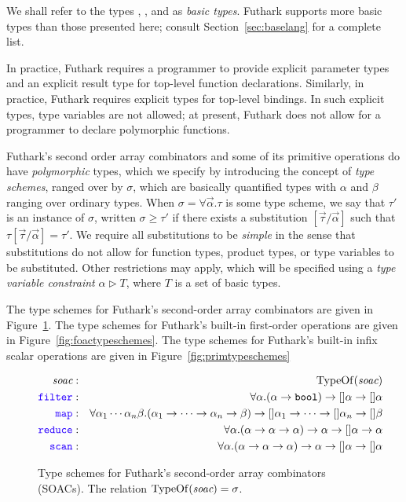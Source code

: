 \documentclass[oneside,11pt]{book}
\begin{document}
\noindent We shall refer to the types , , and  as
\emph{basic types}. Futhark supports more basic types than those
presented here; consult Section~\ref{sec:baselang} for a complete list.

In practice, Futhark requires a programmer to provide explicit
parameter types and an explicit result type for top-level function
declarations. Similarly, in practice, Futhark requires explicit types
for top-level  bindings. In such explicit types, type
variables are not allowed; at present, Futhark does not allow for a
programmer to declare polymorphic functions.

Futhark's second order array combinators and some of its primitive
operations do have \emph{polymorphic} types, which we specify by
introducing the concept of \emph{type schemes}, ranged over by $\sigma$,
which are basically quantified types with $\alpha$ and $\beta$ ranging
over ordinary types. When $\sigma=\forall\vec{\alpha}.\tau$ is some
type scheme, we say that $\tau'$ is an instance of $\sigma$, written
$\sigma \geq \tau'$ if there exists a substitution
$[\vec{\tau}/\vec{\alpha}]$ such that $\tau[\vec{\tau}/\vec{\alpha}] =
\tau'$. We require all substitutions to be \emph{simple} in the sense
that substitutions do not allow for function types, product types, or
type variables to be substituted. Other restrictions may apply, which
will be specified using a \emph{type variable constraint} $\alpha
\triangleright T$, where $T$ is a set of basic types.

The type schemes for Futhark's second-order array combinators are
given in Figure~\ref{fig:soactypeschemes}. The type schemes for
Futhark's built-in first-order operations are given in
Figure~\ref{fig:foactypeschemes}. The type schemes for Futhark's
built-in infix scalar operations are given in
Figure~\ref{fig:primtypeschemes}

\begin{figure}
  \begin{eqnarray*}
\id{soac} & : & \mathrm{TypeOf}(\id{soac}) \\
    \fop{filter} & : & \forall \alpha. (\alpha \rarr \mathtt{bool}) \rarr []\alpha \rarr []\alpha\\
    \fop{map} & : & \forall \alpha_1\cdots\alpha_n\beta. (\alpha_1\rarr\cdots\rarr\alpha_n \rarr \beta) \rarr []\alpha_1 \rarr\cdots\rarr []\alpha_n \rarr []\beta\\
    \fop{reduce} & : & \forall \alpha. (\alpha \rarr \alpha \rarr \alpha) \rarr \alpha \rarr []\alpha \rarr \alpha\\
    \fop{scan} & : & \forall \alpha. (\alpha \rarr \alpha \rarr \alpha) \rarr \alpha \rarr []\alpha \rarr []\alpha\\
  \end{eqnarray*}
  \caption{Type schemes for Futhark's second-order array combinators (SOACs). The relation $\mathrm{TypeOf}(\mbox{\it{soac}}) = \sigma$.}
  \label{fig:soactypeschemes}
\end{figure}
\end{document}
